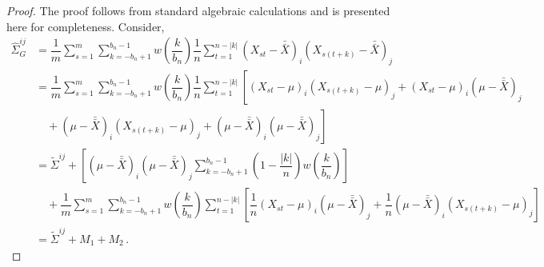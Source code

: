 \documentclass[11pt]{article}
\theoremstyle{remark}
\begin{document}
\begin{proof}
The proof follows from standard algebraic calculations and is presented here for completeness. Consider,
\begin{align*}
\hat{\Sigma}_{G}^{ij} &= \dfrac{1}{m}\sum_{s=1}^{m} \sum_{k=-b_n+1}^{b_n-1}w\left(\dfrac{k}{b_n}\right)\dfrac{1}{n}\sum_{t=1}^{n-|k|} \left(X_{st}-\bar{\bar{X}} \right)_i \left(X_{s(t+k)}-\bar{\bar{X}} \right)_j\\
&= \dfrac{1}{m}\sum_{s=1}^{m}\sum_{k=-b_n+1}^{b_n-1}w\left(\dfrac{k}{b_n}\right)\dfrac{1}{n}\sum_{t=1}^{n-|k|}  \left[ \left(X_{st}-\mu \right)_i  \left(X_{s(t+k)}-\mu \right)_j+  \left(X_{st} - \mu \right)_i    \left(\mu - \bar{\bar{X}} \right)_j \right. \\  
& \quad + \left. \left(\mu-\bar{\bar{X}} \right)_i  \left(X_{s(t+k)}-\mu \right)_j + \left(\mu-\bar{\bar{X}} \right)_i  \left(\mu-\bar{\bar{X}}  \right)_j  \right]\\
& = \tilde{\Sigma}^{ij} + \left[(\mu-\bar{\bar{X}})_i(\mu-\bar{\bar{X}})_j\sum_{k=-b_n+1}^{b_n-1}\left(1-\dfrac{|k|}{n}\right)w\left(\dfrac{k}{b_n}\right)\right] \\ 
& \quad  + \dfrac{1}{m}\sum_{s=1}^{m}\sum_{k=-b_n+1}^{b_n-1}  w\left(\dfrac{k}{b_n}\right)\sum_{t=1}^{n-|k|}  \left[\dfrac{1}{n} \left(X_{st} - \mu \right)_i \left(\mu - \bar{\bar{X}} \right)_j + \dfrac{1}{n} \left(\mu-\bar{\bar{X}} \right)_i  \left(X_{s(t+k)}-\mu \right)_j \right] \\ 
& = \tilde{\Sigma}^{ij} + M_1 + M_2\,.
\end{align*}


\end{proof}
\end{document}
